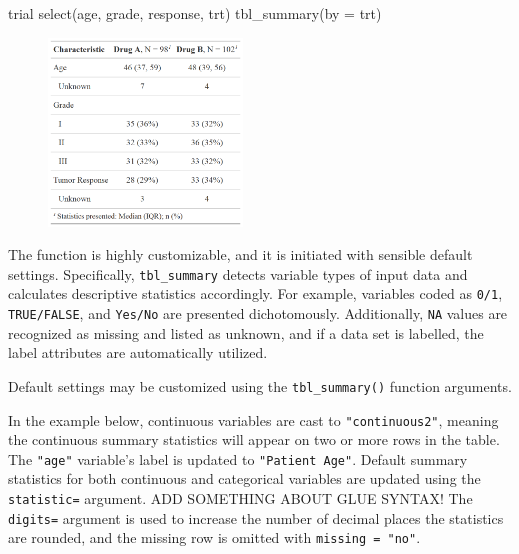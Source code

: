 \begin{example}
trial %
  select(age, grade, response, trt) %
  tbl_summary(by = trt)
\end{example}
\begin{figure}[h!]
  \includegraphics[height=5cm]{summary_basic.png}
  \centering
\end{figure}

The function is highly customizable, and it is initiated with sensible default settings.
Specifically, \texttt{tbl\_summary} detects variable types of input data and calculates descriptive statistics accordingly.
For example, variables coded as \texttt{0/1}, \texttt{TRUE/FALSE}, and \texttt{Yes/No} are presented dichotomously.
Additionally, \texttt{NA} values are recognized as missing and listed as unknown, and if a data set is labelled, the label attributes are automatically utilized. 

Default settings may be customized using the \texttt{tbl\_summary()} function arguments.



In the example below, continuous variables are cast to \texttt{"continuous2"}, meaning the continuous summary statistics will appear on two or more rows in the table.
The \texttt{"age"} variable's label is updated to \texttt{"Patient Age"}.
Default summary statistics for both continuous and categorical variables are updated using the \texttt{statistic=} argument. ADD SOMETHING ABOUT GLUE SYNTAX!
The \texttt{digits=} argument is used to increase the number of decimal places the statistics are rounded, and the missing row is omitted with \texttt{missing = "no"}.

